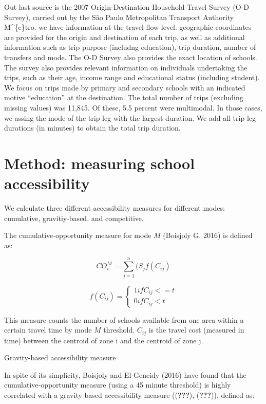 \documentclass[]{article}
\begin{document}
Out last source is the 2007 Origin-Destination Household Travel Survey
(O-D Survey), carried out by the São Paulo Metropolitan Transport
Authority M\^{}\{e\}tro. we have information at the travel flow-level.
geographic coordinates are provided for the origin and destination of
each trip, as well as additional information such as trip purpose
(includng education), trip duration, number of transfers and mode. The
O-D Survey also provides the exact location of schools. The survey also
provides relevant information on individuals undertaking the trips, such
as their age, income range and educational status (including student).
We focus on trips made by primary and secondary schools with an
indicated motive ``education'' at the destination. The total number of
trips (excluding missing values) was 11,845. Of these, 5.5 percent were
multimodal. In those cases, we assing the mode of the trip leg with the
largest duration. We add all trip leg durations (in minutes) to obtain
the total trip duration.

\section{Method: measuring school
accessibility}\label{method-measuring-school-accessibility}

We calculate three different accessibility measures for different modes:
cumulative, gravitiy-based, and competitive.

The cumulative-opportunity measure for mode \(M\) (Boisjoly G. 2016) is
defined as:

\[ CO_{i}^M= \sum_{j=1}^n(S_{j}f(C_{ij}) \]

\[ f(C_{ij}) = \left\{ 
                \begin{array}{ll}
                  1 if C_{ij}<=t\\
                  0 if C_{ij}<t
                \end{array}
              \right.
  \]

This measure counts the number of schools available from one area within
a certain travel time by mode \(M\) threshold. \(C_{ij}\) is the travel
cost (measured in time) between the centroid of zone i and the centroid
of zone j.

Gravity-based accessibility measure

In spite of its simplicity, Boisjoly and El-Geneidy (2016) have found
that the cumulative-opportunity measure (using a 45 minute threshold) is
highly correlated with a gravity-based accessibility measure
(({\textbf{???}}), ({\textbf{???}})), defined as:
\end{document}
